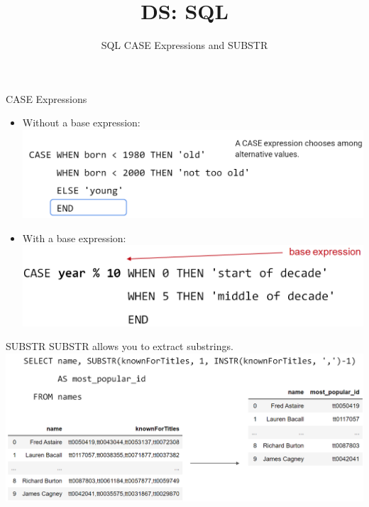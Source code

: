 \documentclass[aspectratio=169]{../latex_main/tntbeamer}  %
\title[Introduction]{DS: SQL}
\subtitle{SQL CASE Expressions and SUBSTR}
\begin{document}
	
	\maketitle
	\begin{frame}{CASE Expressions}
	    \begin{itemize}
	        \item Without a base expression:
	        \includegraphics[scale=.3]{Bild38}
	        \item With a base expression:\\
	        \includegraphics[scale=.35]{Bild39}
	    \end{itemize}
	    
	\end{frame}
	
	
	\begin{frame}{SUBSTR }
	    SUBSTR allows you to extract substrings.
	    \includegraphics[scale=.4]{Bild40}
	\end{frame}
	
	
\end{document}
